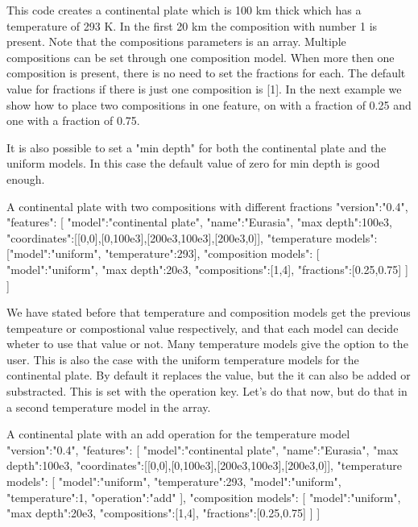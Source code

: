 \documentclass{book}
\begin{document}
This code creates a continental plate which is 100 km thick which has a temperature of 293 K. In the first 20 km the composition with number 1 is present. Note that the compositions parameters is an array. Multiple compositions can be set through one composition model. When more then one composition is present, there is no need to set the fractions for each. The default value for fractions if there is just one composition is [1]. In the next example we show how to place two compositions in one feature, on with a fraction of 0.25 and one with a fraction of 0.75.
\begin{remark}
It is also possible to set a "min depth" for both the continental plate and the uniform models. In this case the default value of zero for min depth is good enough.
\end{remark}

\begin{javascriptcode}{A continental plate with two compositions with different fractions}{}
{
  "version":"0.4",
  "features":
  [
    {
      "model":"continental plate", "name":"Eurasia", "max depth":100e3,
      "coordinates":[[0,0],[0,100e3],[200e3,100e3],[200e3,0]],
      "temperature models":[{"model":"uniform", "temperature":293}],
      "composition models":
      [
        {
          "model":"uniform", "max depth":20e3, "compositions":[1,4], 
          "fractions":[0.25,0.75]
        }
      ]
    }
  ]
}
\end{javascriptcode}

We have stated before that temperature and composition models get the previous tempeature or compostional value respectively, and that each model can decide wheter to use that value or not. Many temperature models give the option to the user. This is also the case with the uniform temperature models for the continental plate. By default it replaces the value, but the it can also be added or substracted. This is set with the operation key. Let's do that now, but do that in a second temperature model in the array.

\begin{javascriptcode}{A continental plate with an add operation for the temperature model}{}
{
  "version":"0.4",
  "features":
  [
    {
      "model":"continental plate", "name":"Eurasia", "max depth":100e3,
      "coordinates":[[0,0],[0,100e3],[200e3,100e3],[200e3,0]],
      "temperature models":
      [
        {"model":"uniform", "temperature":293},
        {"model":"uniform", "temperature":1, "operation":"add"}
      ],
      "composition models":
      [
        {
          "model":"uniform", "max depth":20e3, "compositions":[1,4], 
          "fractions":[0.25,0.75]
        }
      ]
    }
  ]
}
\end{javascriptcode}
\end{document}
